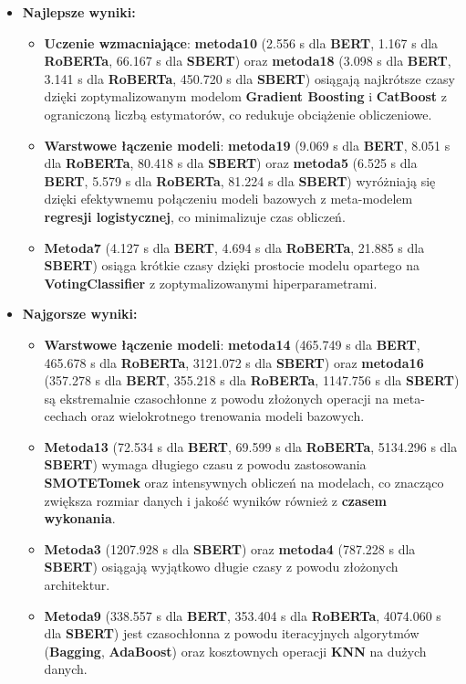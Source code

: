 \begin{itemize}
	\item \textbf{Najlepsze wyniki:}
	      \begin{itemize}
		      \item \textbf{Uczenie wzmacniające}: \textbf{metoda10} (2.556 s dla \textbf{BERT}, 1.167 s dla \textbf{RoBERTa}, 66.167 s dla \textbf{SBERT}) oraz \textbf{metoda18} (3.098 s dla \textbf{BERT}, 3.141 s dla \textbf{RoBERTa}, 450.720 s dla \textbf{SBERT}) osiągają najkrótsze czasy dzięki zoptymalizowanym modelom \textbf{Gradient Boosting} i \textbf{CatBoost} z ograniczoną liczbą estymatorów, co redukuje obciążenie obliczeniowe.
		      \item \textbf{Warstwowe łączenie modeli}: \textbf{metoda19} (9.069 s dla \textbf{BERT}, 8.051 s dla \textbf{RoBERTa}, 80.418 s dla \textbf{SBERT}) oraz \textbf{metoda5} (6.525 s dla \textbf{BERT}, 5.579 s dla \textbf{RoBERTa}, 81.224 s dla \textbf{SBERT}) wyróżniają się dzięki efektywnemu połączeniu modeli bazowych z meta-modelem \textbf{regresji logistycznej}, co minimalizuje czas obliczeń.
		      \item \textbf{Metoda7} (4.127 s dla \textbf{BERT}, 4.694 s dla \textbf{RoBERTa}, 21.885 s dla \textbf{SBERT}) osiąga krótkie czasy dzięki prostocie modelu opartego na \textbf{VotingClassifier} z zoptymalizowanymi hiperparametrami.
	      \end{itemize}
	\item \textbf{Najgorsze wyniki:}
	      \begin{itemize}
		      \item \textbf{Warstwowe łączenie modeli}: \textbf{metoda14} (465.749 s dla \textbf{BERT}, 465.678 s dla \textbf{RoBERTa}, 3121.072 s dla \textbf{SBERT}) oraz \textbf{metoda16} (357.278 s dla \textbf{BERT}, 355.218 s dla \textbf{RoBERTa}, 1147.756 s dla \textbf{SBERT}) są ekstremalnie czasochłonne z powodu złożonych operacji na meta-cechach oraz wielokrotnego trenowania modeli bazowych.
		      \item \textbf{Metoda13} (72.534 s dla \textbf{BERT}, 69.599 s dla \textbf{RoBERTa}, 5134.296 s dla \textbf{SBERT}) wymaga długiego czasu z powodu zastosowania \textbf{SMOTETomek} oraz intensywnych obliczeń na modelach, co znacząco zwiększa rozmiar danych i jakość wyników również z \textbf{czasem wykonania}.
		      \item \textbf{Metoda3} (1207.928 s dla \textbf{SBERT}) oraz \textbf{metoda4} (787.228 s dla \textbf{SBERT}) osiągają wyjątkowo długie czasy z powodu złożonych architektur.
		      \item \textbf{Metoda9} (338.557 s dla \textbf{BERT}, 353.404 s dla \textbf{RoBERTa}, 4074.060 s dla \textbf{SBERT}) jest czasochłonna z powodu iteracyjnych algorytmów (\textbf{Bagging}, \textbf{AdaBoost}) oraz kosztownych operacji \textbf{KNN} na dużych danych.
	      \end{itemize}
\end{itemize}

